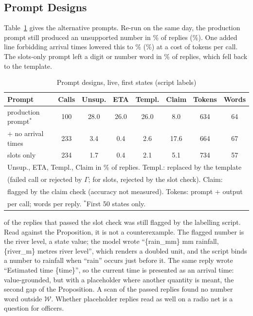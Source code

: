\documentclass[conference]{IEEEtran}
\begin{document}
\subsection{Prompt Designs}
\label{sec:design}
Table~\ref{tab:design} gives the alternative prompts. Re-run on the same day, the production prompt still produced an unsupported number in \VarBaseUnsup\% of replies (\VarBaseCi\%). One added line forbidding arrival times lowered this to \VarNoetaUnsup\% (\VarNoetaCi\%) at a cost of \VarNoetaTokDiff{} tokens per call. The slots-only prompt left a digit or number word in \VarSlotsViol\% of replies, which fell back to the template.

\begin{table}[t]
\caption{Prompt designs, live, first \VarStates{} states (script labels)}
\label{tab:design}
\centering
\footnotesize
\setlength{\tabcolsep}{2.2pt}
\begin{tabular}{lccccccc}
\toprule
Prompt & Calls & Unsup. & ETA & Templ. & Claim & Tokens & Words\\
\midrule
production prompt$^\ast$ & 100 & 28.0 & 26.0 & 26.0 & 8.0 & 634 & 64\\
+ no arrival times & 233 & 3.4 & 0.4 & 2.6 & 17.6 & 664 & 67\\
slots only & 234 & 1.7 & 0.4 & 2.1 & 5.1 & 734 & 57\\
\bottomrule
\multicolumn{8}{l}{\scriptsize Unsup., ETA, Templ., Claim in \% of replies. Templ.: replaced by the template}\\
\multicolumn{8}{l}{\scriptsize (failed call or rejected by $\Gamma$; for slots, rejected by the slot check). Claim:}\\
\multicolumn{8}{l}{\scriptsize flagged by the claim check (accuracy not measured). Tokens: prompt + output}\\
\multicolumn{8}{l}{\scriptsize per call; words per reply. $^\ast$First 50 states only.}\\
\end{tabular}
\end{table}

\VarSlotsResidWCap{} of the \SlotsPassed{} replies that passed the slot check was still flagged by the labelling script. Read against the Proposition, it is not a counterexample. The flagged number is the river level, a state value; the model wrote ``\{rain\_mm\} mm rainfall, \{river\_m\} metres river level'', which renders a doubled unit, and the script binds a number to rainfall when ``rain'' occurs just before it. The same reply wrote ``Estimated time \{time\}'', so the current time is presented as an arrival time: value-grounded, but with a placeholder where another quantity is meant, the second gap of the Proposition. A scan of the passed replies found no number word outside $\mathcal{W}$. Whether placeholder replies read as well on a radio net is a question for officers.
\end{document}
